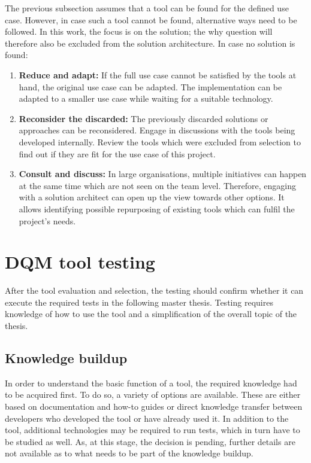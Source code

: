 The previous subsection assumes that a tool can be found for the defined use case. However, in case such a tool cannot be found, alternative ways need to be followed. In this work, the focus is on the solution; the why question will therefore also be excluded from the solution architecture. In case no solution is found:

\begin{enumerate}
\item \textbf{Reduce and adapt:} If the full use case cannot be satisfied by the tools at hand, the original use case can be adapted. The implementation can be adapted to a smaller use case while waiting for a suitable technology.

\item \textbf{Reconsider the discarded:} The previously discarded solutions or approaches can be reconsidered. Engage in discussions with the tools being developed internally. Review the tools which were excluded from selection to find out if they are fit for the use case of this project.

\item \textbf{Consult and discuss:} In large organisations, multiple initiatives can happen at the same time which are not seen on the team level. Therefore, engaging with a solution architect can open up the view towards other options. It allows identifying possible repurposing of existing tools which can fulfil the project's needs.
\end{enumerate}

\section{DQM tool testing}

After the tool evaluation and selection, the testing should confirm whether it can execute the required tests in the following master thesis. Testing requires knowledge of how to use the tool and a simplification of the overall topic of the thesis.




\subsection*{Knowledge buildup}

In order to understand the basic function of a tool, the required knowledge had to be acquired first. To do so, a variety of options are available. These are either based on documentation and how-to guides or direct knowledge transfer between developers who developed the tool or have already used it. In addition to the tool, additional technologies may be required to run tests, which in turn have to be studied as well. As, at this stage, the decision is pending, further details are not available as to what needs to be part of the knowledge buildup.


